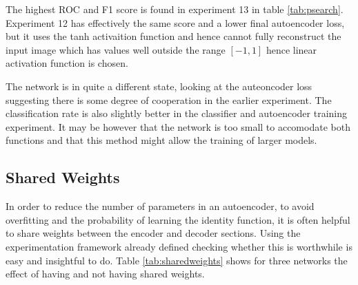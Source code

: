       The highest ROC and F1 score is found in experiment 13 in table \ref{tab:psearch}. Experiment 12
      has effectively the same score and a lower final autoencoder loss, but it uses the tanh activaition
      function and hence cannot fully reconstruct the input image which has values well outside the
      range $[-1,1]$ hence linear activation function is chosen.

      The network is in quite a different state, looking at the auteoncoder loss
      suggesting there is some degree of cooperation in the earlier experiment.
      The classification rate is also slightly better in the classifier and autoencoder
      training experiment. It may be however that the network is too small to accomodate both
      functions and that this method might allow the training of larger models.
      \newpage
    \subsection{Shared Weights}
      In order to reduce the number of parameters in an autoencoder, to avoid overfitting
      and the probability of learning the identity function, it is often helpful to share weights
      between the encoder and decoder sections. Using the experimentation framework already defined
      checking whether this is worthwhile is easy and insightful to do. Table \ref{tab:sharedweights} shows
      for three networks the effect of having and not having shared weights.

